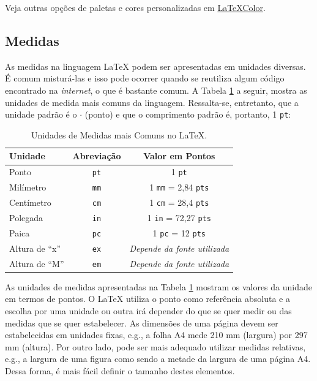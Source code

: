 \begin{marker}
Veja outras opções de paletas e cores personalizadas em \href{http://latexcolor.com}{LaTeXColor}.
\end{marker}

\subsection{Medidas}
\label{sec:medidas}

As medidas na linguagem \LaTeX{} podem ser apresentadas em unidades diversas. É comum misturá-las e isso pode ocorrer quando se reutiliza algum código encontrado na \textit{internet}, o que é bastante comum. A Tabela \ref{tab:medidas} a seguir, mostra as unidades de medida mais comuns da linguagem. Ressalta-se, entretanto, que a unidade padrão é o $\cdot$ (ponto) e que o comprimento padrão é, portanto, 1 {\tt pt}:

\begin{table}[H]
\centering
\caption{Unidades de Medidas mais Comuns no \LaTeX{}.}
\label{tab:medidas}
  \begin{tabular}{p{3cm}cc}
    \toprule
    \textbf{Unidade} & \textbf{Abreviação} & \textbf{Valor em Pontos}  \\
    \midrule
    Ponto           & {\tt pt} & 1 {\tt pt}                            \\
    Milímetro       & {\tt mm} & 1 {\tt mm} = 2,84 {\tt pts}           \\
    Centímetro      & {\tt cm} & 1 {\tt cm} = 28,4 {\tt pts}           \\
    Polegada        & {\tt in} & 1 {\tt in} = 72,27 {\tt pts}          \\
    Paica           & {\tt pc} & 1 {\tt pc} = 12 {\tt pts}             \\
    Altura de ``x'' & {\tt ex} & \textit{Depende da fonte utilizada}   \\
    Altura de ``M'' & {\tt em} & \textit{Depende da fonte utilizada}   \\
    \bottomrule
  \end{tabular}
\end{table}

As unidades de medidas apresentadas na Tabela \ref{tab:medidas} mostram os valores da unidade em termos de pontos. O \LaTeX{} utiliza o ponto como referência absoluta e a escolha por uma unidade ou outra irá depender do que se quer medir ou das medidas que se quer estabelecer. As dimensões de uma página devem ser estabelecidas em unidades fixas, e.g., a folha A4 mede 210 mm (largura) por 297 mm (altura). Por outro lado, pode ser mais adequado utilizar medidas relativas, e.g., a largura de uma figura como sendo a metade da largura de uma página A4. Dessa forma, é mais fácil definir o tamanho destes elementos.


